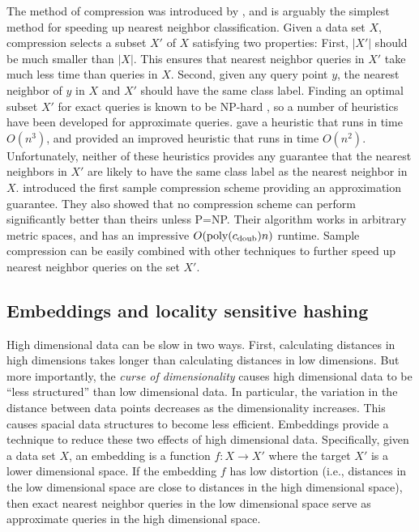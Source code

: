 \documentclass[../main.tex]{subfiles}
\newcommand{\cdoub}{c_\textnormal{doub}}
\newcommand{\poly}[1]{\text{poly}(#1)}
\begin{document}
The method of compression was introduced by \citet{hart1968condensed},
and is arguably the simplest method for speeding up nearest neighbor classification.
Given a data set $X$, compression selects a subset $X'$ of $X$ satisfying two properties:
First, $|X'|$ should be much smaller than $|X|$.
This ensures that nearest neighbor queries in $X'$ take much less time than queries in $X$.
Second, given any query point $y$, 
the nearest neighbor of $y$ in $X$ and $X'$ should have the same class label. 
Finding an optimal subset $X'$ for exact queries is known to be NP-hard \citep{zukhba2010np},
so a number of heuristics have been developed for approximate queries.
\citet{hart1968condensed} gave a heuristic that runs in time $O(n^3)$,
and \cite{angiulli2005fast} provided an improved heuristic that runs in time $O(n^2)$.
Unfortunately, neither of these heuristics provides any guarantee that the nearest neighbors in $X'$ are likely to have the same class label as the nearest neighbor in $X$.
\cite{gottlieb2014near} introduced the first sample compression scheme providing an approximation guarantee.
They also showed that no compression scheme can perform significantly better than theirs unless P=NP.
Their algorithm works in arbitrary metric spaces,
and has an impressive $O(\poly{\cdoub}n)$ runtime.
Sample compression can be easily combined with other techniques to further speed up nearest neighbor queries on the set $X'$.


\subsection{Embeddings and locality sensitive hashing}

High dimensional data can be slow in two ways.
First, calculating distances in high dimensions takes longer than calculating distances in low dimensions.
But more importantly, the \emph{curse of dimensionality} causes high dimensional data to be ``less structured'' than low dimensional data.
In particular, the variation in the distance between data points decreases as the dimensionality increases.
This causes spacial data structures to become less efficient.
Embeddings provide a technique to reduce these two effects of high dimensional data.
Specifically, given a data set $X$, an embedding is a function $f : X \to X'$ where the target $X'$ is a lower dimensional space.
If the embedding $f$ has low distortion 
(i.e., distances in the low dimensional space are close to distances in the high dimensional space),
then exact nearest neighbor queries in the low dimensional space serve as approximate queries in the high dimensional space.
\end{document}
